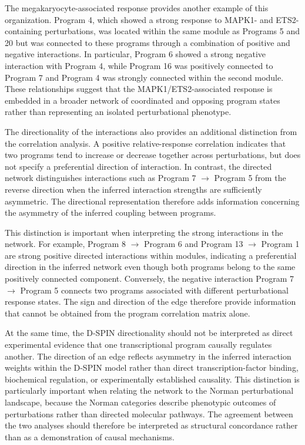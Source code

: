 \documentclass[11pt,a4paper]{article}
\begin{document}
The megakaryocyte-associated response provides another example of this organization. Program 4, which showed a strong response to MAPK1- and ETS2-containing perturbations, was located within the same module as Programs 5 and 20 but was connected to these programs through a combination of positive and negative interactions. In particular, Program 6 showed a strong negative interaction with Program 4, while Program 16 was positively connected to Program 7 and Program 4 was strongly connected within the second module. These relationships suggest that the MAPK1/ETS2-associated response is embedded in a broader network of coordinated and opposing program states rather than representing an isolated perturbational phenotype.

The directionality of the interactions also provides an additional distinction from the correlation analysis. A positive relative-response correlation indicates that two programs tend to increase or decrease together across perturbations, but does not specify a preferential direction of interaction. In contrast, the directed network distinguishes interactions such as Program 7 $\rightarrow$ Program 5 from the reverse direction when the inferred interaction strengths are sufficiently asymmetric. The directional representation therefore adds information concerning the asymmetry of the inferred coupling between programs.

This distinction is important when interpreting the strong interactions in the network. For example, Program 8 $\rightarrow$ Program 6 and Program 13 $\rightarrow$ Program 1 are strong positive directed interactions within modules, indicating a preferential direction in the inferred network even though both programs belong to the same positively connected component. Conversely, the negative interaction Program 7 $\rightarrow$ Program 5 connects two programs associated with different perturbational response states. The sign and direction of the edge therefore provide information that cannot be obtained from the program correlation matrix alone.

At the same time, the D-SPIN directionality should not be interpreted as direct experimental evidence that one transcriptional program causally regulates another. The direction of an edge reflects asymmetry in the inferred interaction weights within the D-SPIN model rather than direct transcription-factor binding, biochemical regulation, or experimentally established causality. This distinction is particularly important when relating the network to the Norman perturbational landscape, because the Norman categories describe phenotypic outcomes of perturbations rather than directed molecular pathways. The agreement between the two analyses should therefore be interpreted as structural concordance rather than as a demonstration of causal mechanisms.
\end{document}
